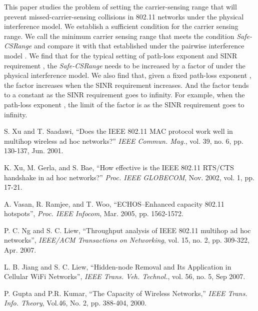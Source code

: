 \documentclass[conference]{IEEEtran}
\begin{document}
This paper studies the problem of setting the carrier-sensing range
that will prevent missed-carrier-sensing collisions in 802.11
networks under the physical interference model. We establish a
suff\/icient condition for the carrier sensing range. We call the
minimum carrier sensing range that meets the condition
\emph{Safe-CSRange} and compare it with that established under the
pairwise interference model \cite{LiBin}. We find that for the
typical setting of path-loss exponent  and SINR
requirement , the \emph{Safe-CSRange} needs to be
increased by a factor of  under the physical interference
model. We also find that, given a fixed path-loss exponent ,
the factor increases when the SINR requirement  increases.
And the factor tends to a constant as the SINR requirement
 goes to infinity. For example, when the path-loss
exponent , the limit of the factor is  as the SINR
requirement  goes to infinity.



\begin{thebibliography}{99}
\providecommand{\url}[1]{#1}

S. Xu and T. Saadawi, ``Does the IEEE 802.11 MAC protocol work well
in multihop wireless ad hoc networks?'' \textit{IEEE Commun. Mag.},
vol. 39, no. 6, pp. 130-137, Jun. 2001.

K. Xu, M. Gerla, and S. Bae, ``How effective is the IEEE 802.11
RTS/CTS handshake in ad hoc networks?'' \textit{Proc. IEEE
GLOBECOM}, Nov. 2002, vol. 1, pp. 17-21.

A. Vasan, R. Ramjee, and T. Woo, ``ECHOS--Enhanced capacity 802.11
hotspots'', \textit{Proc. IEEE Infocom}, Mar. 2005, pp. 1562-1572.

P. C. Ng and S. C. Liew, ``Throughput analysis of IEEE 802.11
multihop ad hoc networks'', \textit{IEEE/ACM Transactions on
Networking}, vol. 15, no. 2, pp. 309-322, Apr. 2007.

L. B. Jiang and S. C. Liew, ``Hidden-node Removal and Its
Application in Cellular WiFi Networks'', \textit{IEEE Trans. Veh.
Technol.}, vol. 56, no. 5, Sep 2007.

P. Gupta and P.R. Kumar, ``The Capacity of Wireless Networks,''
\textit{IEEE Trans. Info. Theory}, Vol.46, No. 2, pp. 388-404, 2000.
\end{thebibliography}
\end{document}
